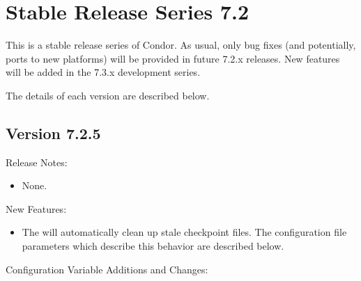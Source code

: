 
\section{\label{sec:History-7-2}Stable Release Series 7.2}

This is a stable release series of Condor.
As usual, only bug fixes (and potentially, ports to new platforms)
will be provided in future 7.2.x releases.
New features will be added in the 7.3.x development series.

The details of each version are described below.

\subsection*{\label{sec:New-7-2-5}Version 7.2.5}

\noindent Release Notes:

\begin{itemize}

\item None.

\end{itemize}


\noindent New Features:

\begin{itemize}

\item The  will automatically clean up stale
checkpoint files. The configuration file parameters which describe this
behavior are described below.

\end{itemize}

\noindent Configuration Variable Additions and Changes:

